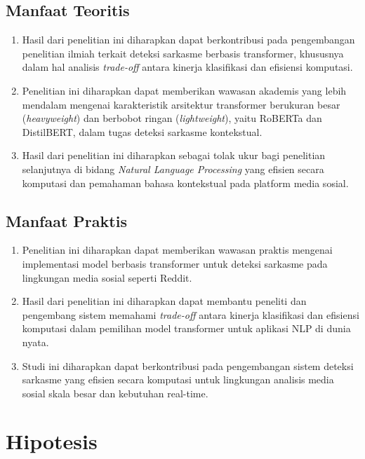 \subsection{Manfaat Teoritis}

\begin{enumerate}
    \item Hasil dari penelitian ini diharapkan dapat berkontribusi pada pengembangan penelitian ilmiah terkait deteksi sarkasme berbasis transformer, khususnya dalam hal analisis \textit{trade-off} antara kinerja klasifikasi dan efisiensi komputasi. 
    \item Penelitian ini diharapkan dapat memberikan wawasan akademis yang lebih mendalam mengenai karakteristik arsitektur transformer berukuran besar (\textit{heavyweight}) dan berbobot ringan (\textit{lightweight}), yaitu RoBERTa dan DistilBERT, dalam tugas deteksi sarkasme kontekstual.
    \item Hasil dari penelitian ini diharapkan sebagai tolak ukur bagi penelitian selanjutnya di bidang \textit{Natural Language Processing} yang efisien secara komputasi dan pemahaman bahasa kontekstual pada platform media sosial.
\end{enumerate}


\subsection{Manfaat Praktis}

\begin{enumerate}
    \item Penelitian ini diharapkan dapat memberikan wawasan praktis mengenai implementasi model berbasis transformer untuk deteksi sarkasme pada lingkungan media sosial seperti Reddit.
    \item Hasil dari penelitian ini diharapkan dapat membantu peneliti dan pengembang sistem memahami \textit{trade-off} antara kinerja klasifikasi dan efisiensi komputasi dalam pemilihan model transformer untuk aplikasi NLP di dunia nyata.
    \item Studi ini diharapkan dapat berkontribusi pada pengembangan sistem deteksi sarkasme yang efisien secara komputasi untuk lingkungan analisis media sosial skala besar dan kebutuhan real-time.
\end{enumerate}


\section{Hipotesis}

